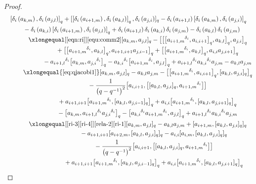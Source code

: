 \documentclass[pdftex]{sigma}
\numberwithin{equation}{section}
\def\lr#1{\left[#1\right]}
\def\lrb#1{\left(#1\right)}
\def\d{\delta}
\begin{document}
\begin{proof}
\begin{gather*}
 \lr{\d_i\lrb{a_{k,m}},\d_i\lrb{a_{j,l}}}_q +[\lr{\d_i\lrb{a_{i+1,m}},\d_i\lrb{a_{k,l}}}_q,\d_i\lrb{a_{j,i}}]_q -\d_i\lrb{a_{i+1,l}}\lr{\d_i\lrb{a_{k,m}},\d_i\lrb{a_{j,i}}}_q\\
 \quad {}-\d_i\lrb{a_{k,i}}\lr{\d_i\lrb{a_{i+1,m}},\d_i\lrb{a_{j,l}}}_q +\d_i\lrb{a_{i+1,l}}\d_i\lrb{a_{k,i}}\d_i\lrb{a_{j,m}}-\d_i\lrb{a_{k,l}}\d_i\lrb{a_{j,m}} \\[-0.5mm]
\quad\qquad\xlongequal[\eqref{eqn:ri}]{\eqref{equ:comm2}} [a_{k,m},a_{j,l} ]_q
- \bigl[ \bigl[ \bigl[{a_{i+1,m}}^{\d_i} ,a_{i,i+1} \bigr]_q,a_{k,l} \bigr]_q ,a_{j,i} \bigr]_q
\\[-0.5mm]
 \quad\qquad\qquad\quad {}+ \bigl[ \bigl[{a_{i+1,m}}^{\d_i} ,a_{k,l} \bigr]_q, a_{i+1,i+1}a_{j,i-1} \bigr]_q+ \bigl[ \bigl[{a_{i+1,m}}^{\d_i} ,a_{k,l} \bigr]_q, a_{i,i}a_{j,i+1} \bigr]_q
\\
 \quad\qquad\qquad\quad {}-{a_{i+1,l}}^{\d_i} \bigl[a_{k,m},{a_{j,i}}^{\d_i} \bigr]_q -{a_{k,i}}^{\d_i} \bigl[{a_{i+1,m}}^{\d_i} ,a_{j,l} \bigr]_q +{a_{i+1,l}}^{\d_i} {a_{k,i}}^{\d_i} a_{j,m}-a_{k,l}a_{j,m}\\[-0.5mm]
\quad\qquad \xlongequal{\eqref{eq:qjacobi1}} [a_{k,m},a_{j,l} ]_q-a_{k,l}a_{j,m} - \bigl[ \bigl[{a_{i+1,m}}^{\d_i} ,a_{i,i+1} \bigr]_q, [a_{k,l},a_{j,i} ]_q \bigr]_q\\[-0.5mm]
\quad\qquad\qquad \quad {}-\frac{1}{\bigl(q-q^{-1}\bigr)^2} \bigl[a_{i,i+1}, \bigl[ [a_{k,l},a_{j,i} ]_q, {a_{i+1,m}}^{\d_i} \bigr] \bigr] \\
 \quad\qquad\qquad\quad {}+a_{i+1,i+1} \bigl[{a_{i+1,m}}^{\d_i}, [a_{k,l},a_{j,i-1} ]_q \bigr]_q +a_{i,i} \bigl[{a_{i+1,m}}^{\d_i} , [a_{k,l},a_{j,i+1} ]_q \bigr]_q \\
\quad\qquad\qquad \quad {}- \bigl[a_{k,m},{a_{i+1,l}}^{\d_i} {a_{j,i}}^{\d_i} \bigr]_q - \bigl[{a_{k,i}}^{\d_i} {a_{i+1,m}}^{\d_i} ,a_{j,l} \bigr]_q +{a_{i+1,l}}^{\d_i} {a_{k,i}}^{\d_i} a_{j,m}\\
\quad\qquad \xlongequal[\eqref{ri-3}\eqref{ri-4}]{\eqref{rela-2}\eqref{ri-1}} [a_{k,m},a_{j,l} ]_q -a_{k,l}a_{j,m} + [a_{i+1,m}, [a_{k,l},a_{j,i} ]_q ]_q \\
\quad\qquad\qquad \qquad\quad {}-a_{i+1,i+1} [a_{i+2,m}, [a_{k,l},a_{j,i} ]_q ]_q -a_{i,i} [a_{i,m}, [a_{k,l},a_{j,i} ]_q ]_q\\
 \quad\qquad\qquad\qquad\quad {}-\frac{1}{\bigl(q-q^{-1}\bigr)^2} \bigl[a_{i,i+1}, \bigl[ [a_{k,l},a_{j,i} ]_q, {a_{i+1,m}}^{\d_i} \bigr] \bigr]\\
 \quad\qquad\qquad\qquad\quad {}+a_{i+1,i+1} \bigl[{a_{i+1,m}}^{\d_i} , [a_{k,l},a_{j,i-1} ]_q \bigr]_q+a_{i,i} \bigl[{a_{i+1,m}}^{\d_i} , [a_{k,l},a_{j,i+1} ]_q \bigr]_q\\

\end{gather*}
\end{proof}
\end{document}
